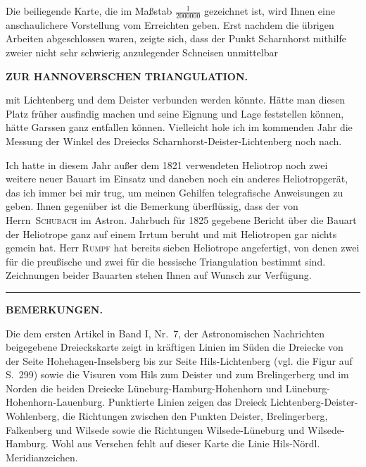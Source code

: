 \par\noindent\hspace*{\parindent}Die beiliegende Karte, die im Maßstab \(\frac{1}{2000000}\) gezeichnet ist, wird Ihnen eine anschaulichere Vorstellung vom Erreichten geben. Erst nachdem die übrigen Arbeiten abgeschlossen waren, zeigte sich, dass der Punkt Scharnhorst mithilfe zweier nicht sehr schwierig anzulegender Schneisen unmittelbar

\par\clearpage
\noindent{}\hfill{\small\textbf{ZUR HANNOVERSCHEN TRIANGULATION.}}\hfill\null\par\medskip
\noindent mit Lichtenberg und dem Deister verbunden werden könnte. Hätte man diesen Platz früher ausfindig machen und seine Eignung und Lage feststellen können, hätte Garssen ganz entfallen können. Vielleicht hole ich im kommenden Jahr die Messung der Winkel des Dreiecks Scharnhorst-Deister-Lichtenberg noch nach.
\par\noindent\hspace*{\parindent}Ich hatte in diesem Jahr außer dem 1821 verwendeten Heliotrop noch zwei weitere neuer Bauart im Einsatz und daneben noch ein anderes Heliotropgerät, das ich immer bei mir trug, um meinen Gehilfen telegrafische Anweisungen zu geben. Ihnen gegenüber ist die Bemerkung überflüssig, dass der von Herrn~\textsc{Schubach} im Astron. Jahrbuch für 1825 gegebene Bericht über die Bauart der Heliotrope ganz auf einem Irrtum beruht und mit  Heliotropen gar nichts gemein hat. Herr \textsc{Rumpf} hat bereits sieben Heliotrope angefertigt, von denen zwei für die preußische und zwei für die hessische Triangulation bestimmt sind. Zeichnungen beider Bauarten stehen Ihnen auf Wunsch zur Verfügung.
\begin{center}\rule{.12\linewidth}{.4pt}\end{center}
\begin{center}\textbf{BEMERKUNGEN.}\end{center}
\begingroup\small
\par\noindent\hspace*{\parindent}Die dem ersten Artikel in Band I, Nr.~7, der Astronomischen Nachrichten beigegebene Dreieckskarte zeigt in kräftigen Linien im Süden die Dreiecke von der Seite Hohehagen-Inselsberg bis zur Seite Hils-Lichtenberg (vgl. die Figur auf S.~299) sowie die Visuren vom Hils zum Deister und zum Brelingerberg und im Norden die beiden Dreiecke Lüneburg-Hamburg-Hohenhorn und Lüneburg-Hohenhorn-Lauenburg. Punktierte Linien zeigen das Dreieck Lichtenberg-Deister-Wohlenberg, die Richtungen zwischen den Punkten Deister, Brelingerberg, Falkenberg und Wilsede sowie die Richtungen Wilsede-Lüneburg und Wilsede-Hamburg. Wohl aus Versehen fehlt auf dieser Karte die Linie Hils-Nördl. Meridianzeichen.
